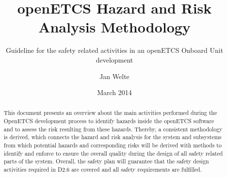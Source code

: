 \documentclass{template/openetcs_report}
\begin{document}
\frontmatter
{}




\title{openETCS Hazard and Risk Analysis Methodology}

\subtitle{Guideline for the safety related activities in an openETCS Onboard Unit development}

\date{March 2014} %


\author{Jan Welte}








\begin{abstract}
This document presents an overview about the main activities performed during the OpenETCS development process to identify hazards inside the openETCS software and to assess the risk resulting from these hazards. Thereby, a consistent methodology is derived, which connects the hazard and risk analysis for the system and subsystems from which potential hazards and corresponding risks will be derived with methods to identify and enforce  to ensure the overall quality during the design of all safety related parts of the system. Overall, the safety plan will guarantee that the safety design activities required in D2.6 are covered and all safety requirements are fulfilled. 
\end{abstract}
\end{document}
